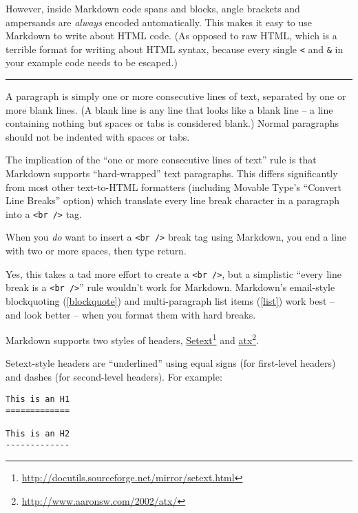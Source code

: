 However, inside Markdown code spans and blocks, angle brackets and
ampersands are \emph{always} encoded automatically. This makes it easy to use
Markdown to write about HTML code. (As opposed to raw HTML, which is a
terrible format for writing about HTML syntax, because every single \texttt{<}
and \texttt{\&} in your example code needs to be escaped.)

\begin{center}\rule{3in}{0.4pt}\end{center}

A paragraph is simply one or more consecutive lines of text, separated
by one or more blank lines. (A blank line is any line that looks like a
blank line -- a line containing nothing but spaces or tabs is considered
blank.) Normal paragraphs should not be indented with spaces or tabs.

The implication of the ``one or more consecutive lines of text'' rule is
that Markdown supports ``hard-wrapped'' text paragraphs. This differs
significantly from most other text-to-HTML formatters (including Movable
Type's ``Convert Line Breaks'' option) which translate every line break
character in a paragraph into a \texttt{<br \slash{}>} tag.

When you \emph{do} want to insert a \texttt{<br \slash{}>} break tag using Markdown, you
end a line with two or more spaces, then type return.

Yes, this takes a tad more effort to create a \texttt{<br \slash{}>}, but a simplistic
``every line break is a \texttt{<br \slash{}>}'' rule wouldn't work for Markdown.
Markdown's email-style blockquoting (\autoref{blockquote}) and multi-paragraph list items (\autoref{list})
work best -- and look better -- when you format them with hard breaks.

Markdown supports two styles of headers, \href{http://docutils.sourceforge.net/mirror/setext.html}{Setext}\footnote{\href{http://docutils.sourceforge.net/mirror/setext.html}{http:\slash{}\slash{}docutils.sourceforge.net\slash{}mirror\slash{}setext.html}} and \href{http://www.aaronsw.com/2002/atx/}{atx}\footnote{\href{http://www.aaronsw.com/2002/atx/}{http:\slash{}\slash{}www.aaronsw.com\slash{}2002\slash{}atx\slash{}}}.

Setext-style headers are ``underlined'' using equal signs (for first-level
headers) and dashes (for second-level headers). For example:

\begin{verbatim}
This is an H1
=============

This is an H2
-------------
\end{verbatim}

